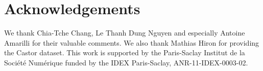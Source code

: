\documentclass{edm_template}
\begin{document}
\section{Acknowledgements}

We thank Chia-Tche Chang, Le Thanh Dung Nguyen and especially Antoine Amarilli for their valuable comments. We also thank Mathias Hiron for providing the Castor dataset. This work is supported by the Paris-Saclay Institut de la Société Numérique funded by the IDEX Paris-Saclay, ANR-11-IDEX-0003-02.\vspace{-2.5mm}

%

\small  %
%
%
\end{document}
